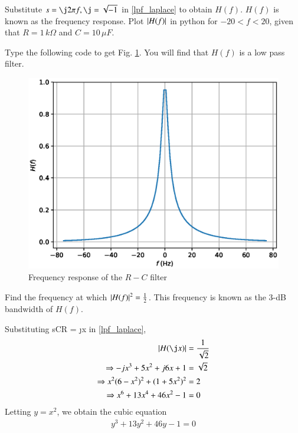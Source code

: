 %
\begin{problem}
Substitute $s = \j 2\pi f, \j =  \sqrt{-1}$ in \eqref{lpf_laplace} to obtain $H(f)$.  $H(f)$ is known as the frequency response. Plot $\left\vert H(f)\right\vert$ in python for $-20 < f < 20$, given that $R = 1 \,k\Omega$ and $C = 10 \,\mu F$.
\end{problem}
%
\solution 
%
Type  the following code to get Fig. \ref{fig:filter_plot}.  You will find that $H(f)$ is a low pass
filter.
%

%
\begin{figure}[!h]
\centering
\includegraphics[width=\columnwidth]{chapter2/figs/2.2.eps}
\caption{Frequency response of the $R-C$ filter}
\label{fig:filter_plot}
\end{figure}
\begin{problem}
Find the frequency at which $\left\vert H(f)\right\vert^2 = \frac{1}{2}$. This frequency is
known as the 3-dB bandwidth of $H(f)$.
\end{problem}
%
\solution Substituting sCR = \j x in \eqref{lpf_laplace},
%
\begin{align}
 \abs{H(\j x)} &= \frac{1}{\sqrt{2}} \\
 \Rightarrow 
 -jx^3 + 5x^2 +j6x + 1 &= \sqrt{2} \\
\Rightarrow 
 x^2(6-x^2)^2 + (1+5x^2)^2 &= 2 \\
 \Rightarrow 
x^6 + 13x^4 + 46x^2 -1&= 0 
\end{align}
%
Letting $y=x^2$, we obtain the cubic equation
%
\begin{align}
y^3 + 13y^2 + 46 y -1 = 0
\end{align}

